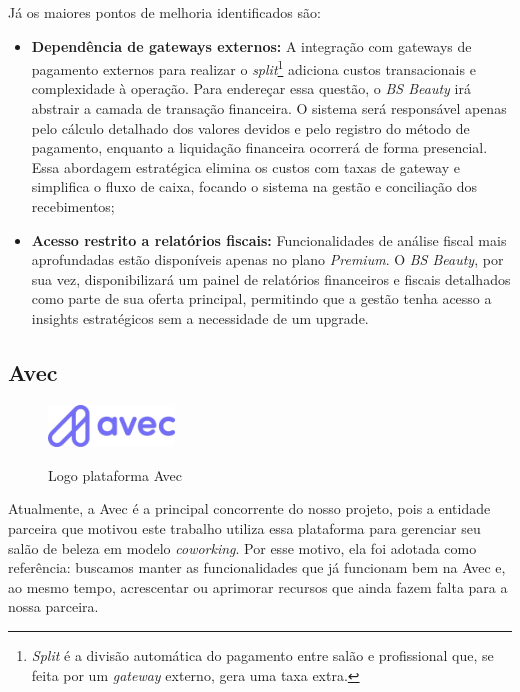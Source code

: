 Já os maiores pontos de melhoria identificados são:

\begin{itemize}
	\item \textbf{Dependência de gateways externos:} A integração com gateways de pagamento externos para realizar o \emph{split}\footnote{\emph{Split} é a divisão automática do pagamento entre salão e profissional que, se feita por um \emph{gateway} externo, gera uma taxa extra.} adiciona custos transacionais e complexidade à operação. Para endereçar essa questão, o \emph{BS Beauty} irá abstrair a camada de transação financeira. O sistema será responsável apenas pelo cálculo detalhado dos valores devidos e pelo registro do método de pagamento, enquanto a liquidação financeira ocorrerá de forma presencial. Essa abordagem estratégica elimina os custos com taxas de gateway e simplifica o fluxo de caixa, focando o sistema na gestão e conciliação dos recebimentos;
	
	
	\item \textbf{Acesso restrito a relatórios fiscais:} Funcionalidades de análise fiscal mais aprofundadas estão disponíveis apenas no plano \emph{Premium}. O \emph{BS Beauty}, por sua vez, disponibilizará um painel de relatórios financeiros e fiscais detalhados como parte de sua oferta principal, permitindo que a gestão tenha acesso a insights estratégicos sem a necessidade de um upgrade.
	
\end{itemize}

\subsection{Avec}

\begin{figure}[htb]
	\centering
	\caption{Logo plataforma Avec}
	\includegraphics[width=0.3\textwidth]{cap01-Introducao/Images/1.4.3_Avec}
	\label{fig:Avec}
\end{figure}

 \FloatBarrier

Atualmente, a Avec é a principal concorrente do nosso projeto, pois a entidade parceira que motivou este trabalho utiliza essa plataforma para gerenciar seu salão de beleza em modelo \emph{coworking}. Por esse motivo, ela foi adotada como referência: buscamos manter as funcionalidades que já funcionam bem na Avec e, ao mesmo tempo, acrescentar ou aprimorar recursos que ainda fazem falta para a nossa parceira.

